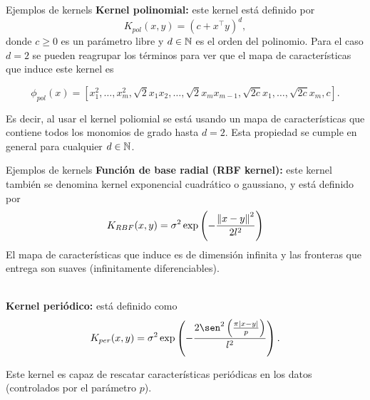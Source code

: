 \documentclass[9pt, handout]{beamer}
\begin{document}
\begin{frame}{Ejemplos de kernels}
\textbf{Kernel polinomial:} este kernel está definido por
\begin{equation*}
       K_{pol} (x, y) = (c + x^\top y)^d,
\end{equation*}
donde $c\geq 0$ es un parámetro libre y $d\in{\mathbb N}$ es el orden del polinomio. \pause Para el caso $d=2$ se pueden reagrupar los términos para ver que el mapa de características que induce este kernel es
    
\begin{equation*}
        \phi_{pol}(x) = [x_1^2,\ldots,x_m^2,\sqrt{2}x_1x_2,\ldots, \sqrt{2}x_{m}x_{m-1},\sqrt{2c}x_1,\ldots,\sqrt{2c}x_m,c].
\end{equation*}\pause

Es decir, al usar el kernel poliomial se está usando un mapa de características que contiene todos los monomios de grado hasta $d=2$. Esta propiedad se cumple en general para cualquier $d\in{\mathbb N}$.

\end{frame}

\begin{frame}{Ejemplos de kernels}
\textbf{Función de base radial (RBF kernel):} este kernel también se denomina kernel exponencial cuadrático o gaussiano, y está definido por
    \begin{equation*}
        K_{RBF} (x , y ) = \sigma^2 \exp\left(-\frac{\left\lVert x -y\right\rVert^2}{2l^2}\right)
    \end{equation*}
El mapa de características que induce es de dimensión infinita y las fronteras que entrega son suaves (infinitamente diferenciables).\\~\ \pause

\textbf{Kernel periódico:} está definido como
    \begin{equation*}
       K_{per} (x , y) = \sigma^2 \exp\left(- \frac{2\sen^2 \left(\frac{\pi|x -y|}{p}\right)}{l^2}\right).
    \end{equation*}
    
    Este kernel es capaz de rescatar características periódicas en los datos (controlados por el parámetro $p$). 
\end{frame}
\end{document}

